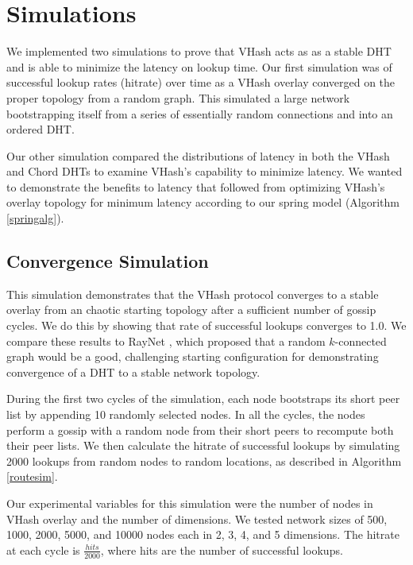 \documentclass{IEEEtran}
\begin{document}



\section{Simulations}
We implemented two simulations to prove that VHash acts as as a stable DHT and is able to minimize the latency on lookup time.
Our first simulation was of successful lookup rates (hitrate) over time as a VHash overlay converged on the proper topology from a random graph.  
This simulated a large network bootstrapping itself from a series of essentially random connections and into an ordered DHT.
  
Our other simulation compared the distributions of latency in both the VHash and Chord DHTs to examine VHash's capability to minimize latency. 
We wanted to demonstrate the benefits to latency that followed from optimizing VHash's overlay topology for minimum latency according to our spring model (Algorithm \ref{springalg}).

\subsection{Convergence Simulation}
This simulation demonstrates that the VHash protocol converges to a stable overlay from an chaotic starting topology after a sufficient number of gossip cycles.  
We do this by showing that rate of successful lookups converges to 1.0.
We compare these results to RayNet \cite{raynet}, which proposed that a random $k$-connected graph would be a good, challenging starting configuration for demonstrating convergence of a DHT to a stable network topology.

During the first two cycles of the simulation, each node bootstraps its short peer list by appending 10 randomly selected nodes.
In all the cycles, the nodes perform a gossip with a random node from their short peers to recompute both their peer lists.
We then calculate the hitrate of successful lookups by simulating 2000 lookups from random nodes to random locations, as described in Algorithm \ref{routesim}.

Our experimental variables for this simulation were the number of nodes in VHash overlay and the number of dimensions.  
We tested network sizes of 500, 1000, 2000, 5000, and 10000 nodes each in 2, 3, 4, and 5 dimensions.
The hitrate at each cycle is $\frac{hits}{2000}$, where hits are the number of successful lookups.
\end{document}
